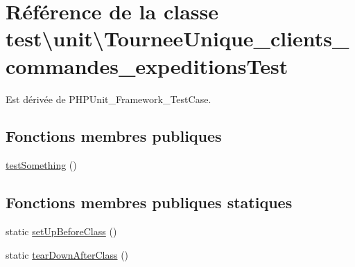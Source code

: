 \hypertarget{classtest_1_1unit_1_1TourneeUnique__clients__commandes__expeditionsTest}{}\section{Référence de la classe test\textbackslash{}unit\textbackslash{}Tournee\+Unique\+\_\+clients\+\_\+commandes\+\_\+expeditions\+Test}
\label{classtest_1_1unit_1_1TourneeUnique__clients__commandes__expeditionsTest}


Est dérivée de P\+H\+P\+Unit\+\_\+\+Framework\+\_\+\+Test\+Case.

\subsection*{Fonctions membres publiques}
\begin{DoxyCompactItemize}
\item 
\hyperlink{classtest_1_1unit_1_1TourneeUnique__clients__commandes__expeditionsTest_a3387dc9e3f5c053b5e474e366cb4556a}{test\+Something} ()
\end{DoxyCompactItemize}
\subsection*{Fonctions membres publiques statiques}
\begin{DoxyCompactItemize}
\item 
static \hyperlink{classtest_1_1unit_1_1TourneeUnique__clients__commandes__expeditionsTest_a08795a56a2a5acff8256a03d2c2b3497}{set\+Up\+Before\+Class} ()
\item 
static \hyperlink{classtest_1_1unit_1_1TourneeUnique__clients__commandes__expeditionsTest_ab65690b92726f8eacc99a9d55c7b38c4}{tear\+Down\+After\+Class} ()
\end{DoxyCompactItemize}
